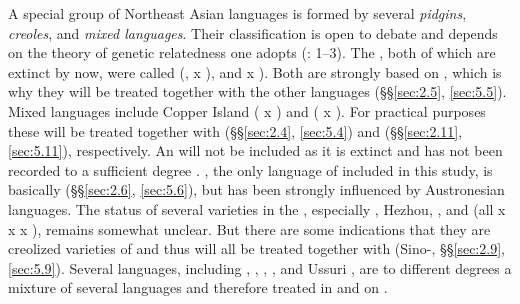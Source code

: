 A special group of Northeast Asian languages is formed by several \textit{pidgins}, \textit{creoles}, and \textit{mixed languages}. Their classification is open to debate and depends on the theory of genetic relatedness one adopts (\citealt{Operstein2015}: 1–3). The , both of which are extinct by now, were called  (,  x ), and  x ). Both are strongly based on , which is why they will be treated together with the other  languages (§§\ref{sec:2.5}, \ref{sec:5.5}). Mixed languages include Copper Island  ( x ) and  ( x ). For practical purposes these will be treated together with  (§§\ref{sec:2.4}, \ref{sec:5.4}) and  (§§\ref{sec:2.11}, \ref{sec:5.11}), respectively. An  will not be included as it is extinct and has not been recorded to a sufficient degree \citep[81]{Fortescue2003}. , the only language of  included in this study, is basically  (§§\ref{sec:2.6}, \ref{sec:5.6}), but has been strongly influenced by Austronesian languages. The status of several varieties in the , especially , Hezhou, , and  (all  x  x  x ), remains somewhat unclear. But there are some indications that they are creolized varieties of  and thus will all be treated together with  (Sino-, §§\ref{sec:2.9}, \ref{sec:5.9}). Several languages, including , , , , and Ussuri , are to different degrees a mixture of several  languages and therefore treated in  and  on .

